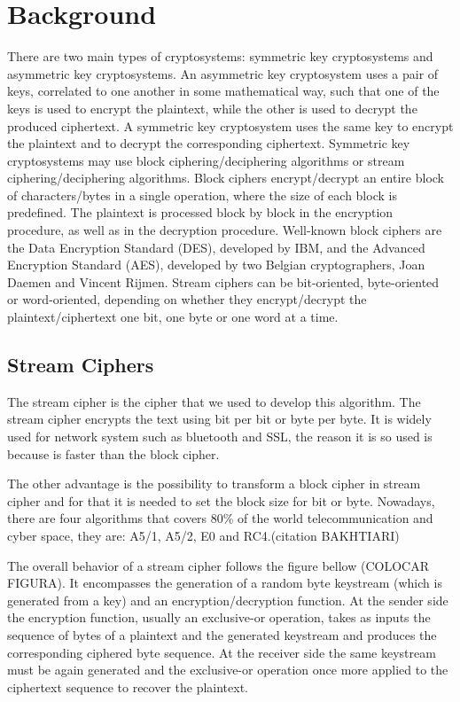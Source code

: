 \documentclass{llncs}
\begin{document}
%
\section{Background}
%
There are two main types of cryptosystems: symmetric key cryptosystems and asymmetric key cryptosystems. An asymmetric key cryptosystem uses a pair of keys, correlated to one another in some mathematical way, such that one of the keys is used to encrypt the plaintext, while the other is used to decrypt the produced ciphertext. A symmetric key cryptosystem uses the same key to encrypt the plaintext and to decrypt the corresponding ciphertext. Symmetric key cryptosystems may use block ciphering/deciphering algorithms or stream ciphering/deciphering algorithms. 
%
Block ciphers encrypt/decrypt an entire block of characters/bytes in a single operation, where the size of each block is predefined. The plaintext is processed block by block in the encryption procedure, as well as in the decryption procedure. Well-known block ciphers are the Data Encryption Standard (DES), developed by IBM, and the Advanced Encryption Standard (AES), developed by two Belgian cryptographers, Joan Daemen and Vincent Rijmen.
%
Stream ciphers can be bit-oriented, byte-oriented or word-oriented, depending on whether they encrypt/decrypt the plaintext/ciphertext one bit, one byte or one word at a time.
\subsection{Stream Ciphers}
%
The stream cipher is the cipher that we used to develop this algorithm. The stream cipher encrypts the text using bit per bit or byte per byte.  It is widely used for network system such as bluetooth and SSL, the reason it is so used is because is faster than the block cipher.

The other advantage is the possibility to transform a block cipher in stream cipher and for that it is needed to set the block size for bit or byte. Nowadays, there are four algorithms that covers 80\% of the world telecommunication and cyber space, they are: A5/1, A5/2, E0 and RC4.(citation BAKHTIARI)

The overall behavior of a stream cipher follows the figure bellow (COLOCAR FIGURA). It encompasses the generation of a random byte keystream (which is generated from a key) and an encryption/decryption function. At the sender side the encryption function, usually an exclusive-or operation, takes as inputs the sequence of bytes of a plaintext and the generated keystream and produces the corresponding ciphered byte sequence. At the receiver side the same keystream must be again generated and the exclusive-or operation once more applied to the ciphertext sequence to recover the plaintext.
\end{document}
